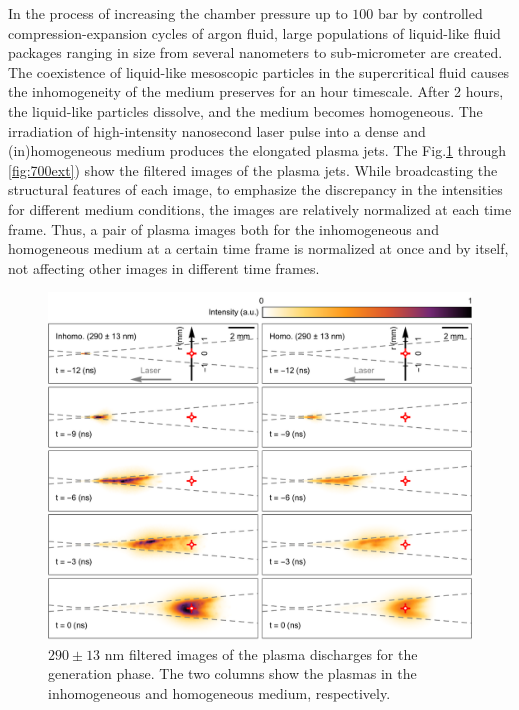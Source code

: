 In the process of increasing the chamber pressure up to $100 \text{ bar}$ by controlled compression-expansion cycles of argon fluid, large populations of liquid-like fluid packages ranging in size from several nanometers to sub-micrometer are created. The coexistence of liquid-like mesoscopic particles in the supercritical fluid causes the inhomogeneity of the medium preserves for an hour timescale. After 2 hours, the liquid-like particles dissolve, and the medium becomes homogeneous. The irradiation of high-intensity nanosecond laser pulse into a dense and (in)homogeneous medium produces the elongated plasma jets. The Fig.\ref{fig:290gen} through \ref{fig:700ext}) show the filtered images of the plasma jets. While broadcasting the structural features of each image, to emphasize the discrepancy in the intensities for different medium conditions, the images are relatively normalized at each time frame. Thus, a pair of plasma images both for the inhomogeneous and homogeneous medium at a certain time frame is normalized at once and by itself, not affecting other images in different time frames.

\begin{figure}[ht!]
\centering
\includegraphics[width=130mm]{figures/ch4/imaging/290gen.pdf}
\caption{$290\pm13 \text{ nm}$ filtered images of the plasma discharges for the generation phase. The two columns show the plasmas in the inhomogeneous and homogeneous medium, respectively.}
\label{fig:290gen}
\end{figure}

